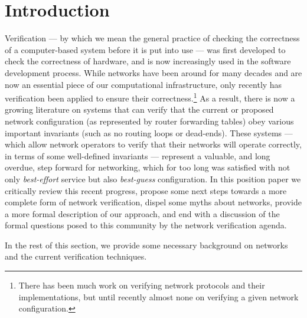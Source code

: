 \section{Introduction}
\label{sec:introduction}

Verification --- by which we mean the general practice of checking the correctness of a computer-based system before it is put into use --- was first developed to
check the correctness of hardware, and is now increasingly used in the software development process. While networks have been around for many decades and are now an essential piece of our computational infrastructure, only recently has verification been applied to ensure their correctness.\footnote{There has been much work on verifying network protocols and their implementations, but until recently almost none on verifying a given network configuration.} As a result, there is now a growing literature on systems that can verify that the current or proposed network configuration (as represented by router forwarding tables) obey various important invariants (such as no routing loops or dead-ends).
These systems --- which allow network operators to verify that their networks will operate correctly, in terms of some well-defined invariants --- represent a valuable, and long overdue, step forward for networking, which for too long was satisfied with not only {\em best-effort} service but also {\em best-guess} configuration. In this position paper we critically review this recent progress, propose some next steps towards a more complete form of network verification, dispel some myths about networks, provide a more formal description of our approach, and end with a discussion of the formal questions posed to this community by the network verification agenda.

In the rest of this section, we provide some necessary background on networks and the current verification techniques. 


